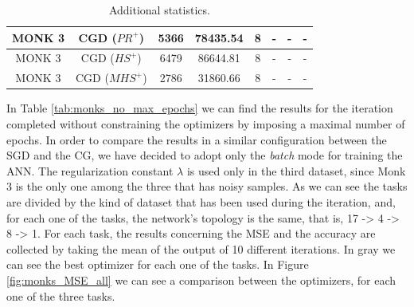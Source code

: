 \begin{table}[H]
\begin{subtable}{\textwidth}
{\begin{tabular}{| c | c | c | c | c | c | c | c |}
                            \hline
                            MONK 3 & CGD ($PR^{+}$) & 5366 & 78435.54 & 8 & - & - & - \\
                            \hline
                            MONK 3 & CGD ($HS^{+}$) & 6479 & 86644.81 & 8 & - & - & - \\
                            \hline
                            MONK 3 & CGD ($MHS^{+}$) & 2786 & 31860.66 & 8 & - & - & - \\
                            \hline
                        \end{tabular}
                    }
                \end{subtable}
                \caption{Additional statistics.}
                \label{tab:monks_additional_no_max_epochs}
            \end{table}

            In Table \ref{tab:monks_no_max_epochs} we can find the results for the iteration completed without
            constraining the optimizers by imposing a maximal number of epochs. In order to compare the
            results in a similar configuration between the SGD and the CG, we have decided to adopt only the
            \textit{batch} mode for training the ANN. The regularization constant $\lambda$ is used only in
            the third dataset, since Monk 3 is the only one among the three that has noisy samples. As we can
            see the tasks are divided by the kind of dataset that has been used during the iteration, and, for
            each one of the tasks, the network's topology is the same, that is, 17 -> 4 -> 8 -> 1. For each
            task, the results concerning the MSE and the accuracy are collected by taking the mean of the
            output of 10 different iterations. In gray we can see the best optimizer for each one of the
            tasks. In Figure \ref{fig:monks_MSE_all} we can see a comparison between the optimizers, for each
            one of the three tasks.

